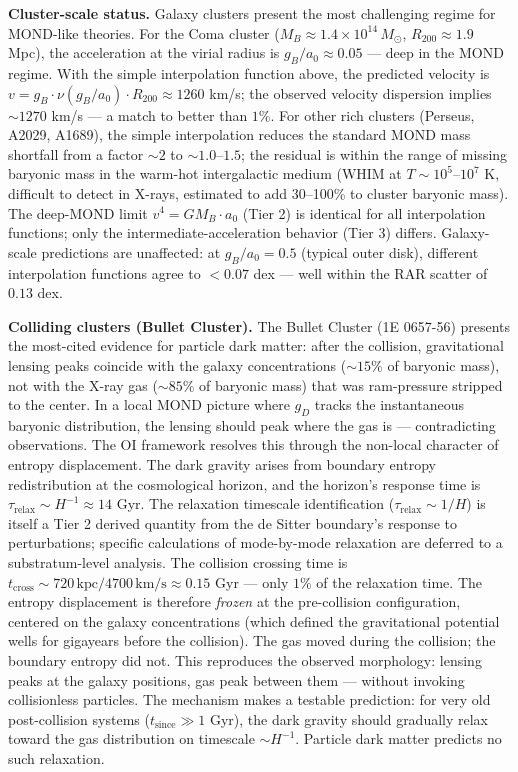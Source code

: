 \documentclass[
]{article}
\begin{document}
\textbf{Cluster-scale status.} Galaxy clusters present the most
challenging regime for MOND-like theories. For the Coma cluster
(\(M_B \approx 1.4 \times 10^{14}\,M_\odot\), \(R_{200} \approx 1.9\)
Mpc), the acceleration at the virial radius is \(g_B/a_0 \approx 0.05\)
--- deep in the MOND regime. With the simple interpolation function
above, the predicted velocity is
\(v = g_B \cdot \nu(g_B/a_0) \cdot R_{200} \approx 1260\) km/s; the
observed velocity dispersion implies \(\sim 1270\) km/s --- a match to
better than \(1\%\). For other rich clusters (Perseus, A2029, A1689),
the simple interpolation reduces the standard MOND mass shortfall from a
factor \(\sim 2\) to \(\sim 1.0\)--\(1.5\); the residual is within the
range of missing baryonic mass in the warm-hot intergalactic medium
(WHIM at \(T \sim 10^5\)--\(10^7\) K, difficult to detect in X-rays,
estimated to add 30--100\% to cluster baryonic mass). The deep-MOND
limit \(v^4 = GM_B \cdot a_0\) (Tier 2) is identical for all
interpolation functions; only the intermediate-acceleration behavior
(Tier 3) differs. Galaxy-scale predictions are unaffected: at
\(g_B/a_0 = 0.5\) (typical outer disk), different interpolation
functions agree to \(< 0.07\) dex --- well within the RAR scatter of
\(0.13\) dex.

\textbf{Colliding clusters (Bullet Cluster).} The Bullet Cluster (1E
0657-56) presents the most-cited evidence for particle dark matter:
after the collision, gravitational lensing peaks coincide with the
galaxy concentrations (\(\sim 15\%\) of baryonic mass), not with the
X-ray gas (\(\sim 85\%\) of baryonic mass) that was ram-pressure
stripped to the center. In a local MOND picture where \(g_D\) tracks the
instantaneous baryonic distribution, the lensing should peak where the
gas is --- contradicting observations. The OI framework resolves this
through the non-local character of entropy displacement. The dark
gravity arises from boundary entropy redistribution at the cosmological
horizon, and the horizon's response time is
\(\tau_{\text{relax}} \sim H^{-1} \approx 14\) Gyr. The relaxation
timescale identification (\(\tau_{\text{relax}} \sim 1/H\)) is itself a
Tier 2 derived quantity from the de Sitter boundary's response to
perturbations; specific calculations of mode-by-mode relaxation are
deferred to a substratum-level analysis. The collision crossing time is
\(t_{\text{cross}} \sim 720\,\text{kpc}/4700\,\text{km/s} \approx 0.15\)
Gyr --- only \(1\%\) of the relaxation time. The entropy displacement is
therefore \emph{frozen} at the pre-collision configuration, centered on
the galaxy concentrations (which defined the gravitational potential
wells for gigayears before the collision). The gas moved during the
collision; the boundary entropy did not. This reproduces the observed
morphology: lensing peaks at the galaxy positions, gas peak between them
--- without invoking collisionless particles. The mechanism makes a
testable prediction: for very old post-collision systems
(\(t_{\text{since}} \gg 1\) Gyr), the dark gravity should gradually
relax toward the gas distribution on timescale \(\sim H^{-1}\). Particle
dark matter predicts no such relaxation.
\end{document}
